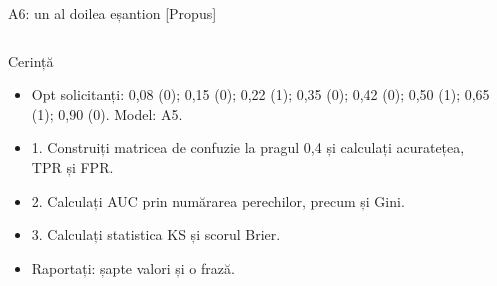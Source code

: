 \begin{frame}{A6: un al doilea eșantion [Propus]}
\propsub
\itemsize{\scriptsize}
\begin{columns}[T]
\begin{column}{\taskw}
\begin{block}{Cerință}
\begin{itemize}
    \item Opt solicitanți: 0,08 (0); 0,15 (0); 0,22 (1); 0,35 (0); 0,42 (0); 0,50 (1); 0,65 (1); 0,90 (0). Model: A5.
    \item 1. Construiți matricea de confuzie la pragul 0,4 și calculați acuratețea, TPR și FPR.
    \item 2. Calculați AUC prin numărarea perechilor, precum și Gini.
    \item 3. Calculați statistica KS și scorul Brier.
    \item Raportați: șapte valori și o frază.
\end{itemize}
\end{block}
\end{column}
\begin{column}{\solw}
\end{column}
\end{columns}
\end{frame}

